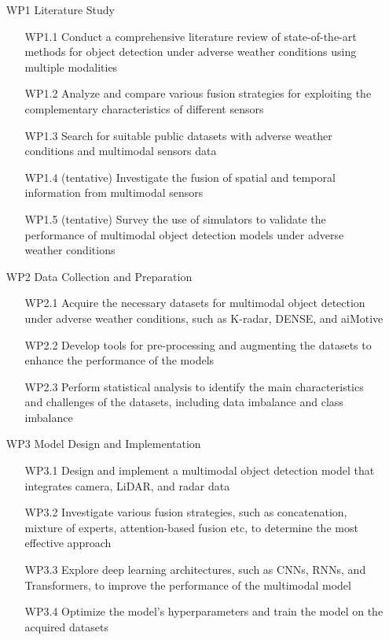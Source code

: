 \documentclass[rnd]{mas_proposal}
\begin{document}
\begin{enumerate}
    
      \item[WP1] Literature Study
      \begin{itemize}
            
            \item[WP1.1] Conduct a comprehensive literature review of state-of-the-art methods for object detection under adverse weather conditions using multiple modalities
            \item[WP1.2] Analyze and compare various fusion strategies for exploiting the complementary characteristics of different sensors 
            \item[WP1.3] Search for suitable public datasets with adverse weather conditions and multimodal sensors data
            \item[WP1.4] (tentative) Investigate the fusion of spatial and temporal information from multimodal sensors
            \item[WP1.5] (tentative) Survey the use of simulators to validate the performance of multimodal object detection models under adverse weather conditions
            
      \end{itemize}


      \item[WP2] Data Collection and Preparation
      \begin{itemize}
            
            \item[WP2.1] Acquire the necessary datasets for multimodal object detection under adverse weather conditions, such as K-radar, DENSE, and aiMotive
            \item[WP2.2] Develop tools for pre-processing and augmenting the datasets to enhance the performance of the models
            \item[WP2.3] Perform statistical analysis to identify the main characteristics and challenges of the datasets, including data imbalance and class imbalance
            
      \end{itemize}

      \item[WP3] Model Design and Implementation
      \begin{itemize}
            
            \item[WP3.1] Design and implement a multimodal object detection model that integrates camera, LiDAR, and radar data
            \item[WP3.2] Investigate various fusion strategies, such as concatenation, mixture of experts, attention-based fusion etc, to  determine the most effective approach
            \item[WP3.3] Explore deep learning architectures, such as CNNs, RNNs, and Transformers, to improve the performance of the multimodal model
            \item[WP3.4] Optimize the model's hyperparameters and train the model on the acquired datasets
      

\end{itemize}
\end{enumerate}
\end{document}
